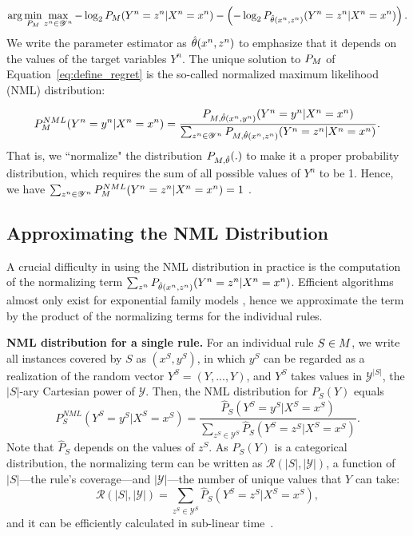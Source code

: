 \begin{equation}
\label{eq:define_regret}
	  \arg \min_{P_{M}} \max_{z^n \in \mathscr{Y}^n} -\log_2 P_{M} (Y^n = z^n|X^n = x^n) - \left(-\log_2 P_{\hat{\theta}(x^n, z^n)} (Y^n = z^n|X^n = x^n)\right).
\end{equation}
We write the parameter estimator as $\hat{\theta}(x^n, z^n)$ to emphasize that it depends on the values of the target variables $Y^n$. The unique solution to $P_{M}$ of Equation~\ref{eq:define_regret} is the so-called normalized maximum likelihood (NML) distribution:

\begin{equation}
    P^{NML}_{M}(Y^n=y^n|X^n=x^n) = \frac{P_{M, \hat{\theta}(x^n, y^n)}(Y^n=y^n|X^n=x^n)}{\sum_{z^n \in \mathscr{Y}^n} P_{M, \hat{\theta}(x^n, z^n)}(Y^n = z^n|X^n=x^n)}.
\end{equation}
That is, we ``normalize" the distribution $P_{M, \hat{\theta}}(.)$ to make it a proper probability distribution, which requires the sum of all possible values of $Y^n$ to be 1. Hence, we have $\sum_{z^n \in \mathscr{Y}^n} P^{NML}_{M}(Y^n=z^n|X^n=x^n) = 1$ \citep{grunwald2019minimum}.

\subsection{Approximating the NML Distribution}

A crucial difficulty in using the NML distribution in practice is the computation of the normalizing term $\sum_{z^n} P_{\hat{\theta}(x^n, z^n)}(Y^n=z^n|X^n=x^n)$. Efficient algorithms almost only exist for exponential family models \citep{grunwald2019minimum}, hence we approximate the term by the product of the normalizing terms for the individual rules. 

\smallskip
\noindent \textbf{NML distribution for a single rule.}
For an individual rule $S \in M$, we write all instances covered by $S$ as $(x^S, y^S)$, in which $y^S$ can be regarded as a realization of the random vector $Y^S = (Y, ..., Y)$, and $Y^S$ takes values in $\mathscr{Y}^{|S|}$, the $|S|$-ary Cartesian power of $\mathscr{Y}$. Then, the NML distribution for $P_S(Y)$ equals
\begin{equation}
    P^{NML}_S(Y^S = y^{S}|X^S = x^S) = \frac{\hat{P}_S(Y^S = y^S|X^S = x^S)}{\sum_{z^S \in \mathscr{Y}^S} \hat{P}_S(Y^S = z^S|X^S = x^S)}.
\end{equation}
Note that $\hat{P}_{S}$ depends on the values of $z^S$. As $\hat{P}_S(Y)$ is a categorical distribution, the normalizing term can be written as $\mathcal{R}(|S|, |\mathscr{Y}|)$, a function of $|S|$---the rule's coverage---and $|\mathscr{Y}|$---the number of unique values that $Y$ can take:
\begin{equation}
    \mathcal{R}(|S|, |\mathscr{Y}|) = \sum_{z^S \in \mathscr{Y}^S} \hat{P}_S(Y^S = z^S|X^S = x^S),
\end{equation}
and it can be efficiently calculated in sub-linear time~\citep{mononen:08:sub-lin-stoch-comp}.

